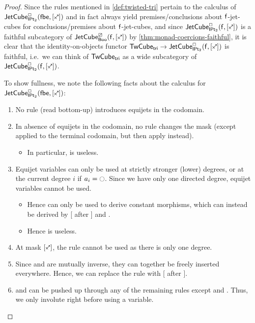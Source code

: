 \documentclass[a4paper]{memoir}
\begin{document}
\begin{proof}
	Since the rules mentioned in \cref{def:twisted-tri} pertain to the calculus of $\jetcubetri \affine \bipointedsym {[\ypolar]}$ and in fact always yield premises/conclusions about ${\mathsf{f}}$-jet-cubes for conclusions/premises about ${\mathsf{f}}$-jet-cubes, and since $\jetcubefwd \affine \bipointedsym {[\ypolar]}$ is a faithful subcategory of $\jetcubefwd \cartes \booleanalg {[\ypolar]}$ by \cref{thm:monad-coercions-faithful}, it is clear that the identity-on-objects functor $\twistedcubetri \to \jetcubefwd \affine \bipointedsym {[\ypolar]}$ is faithful, i.e.\ we can think of ${\mathsf{TwCube}}_{\mathsf{tri}}$ as a wide subcategory of $\jetcubefwd \affine \bipointedsym {[\ypolar]}$.
	
	To show fullness, we note the following facts about the calculus for $\jetcubetri \affine \bipointedsym {[\ypolar]}$:
	\begin{enumerate}
		\item No rule (read bottom-up) introduces equijets in the codomain.
		\item In absence of equijets in the codomain, no rule changes the mask (except  applied to the terminal codomain, but then apply  instead).
		\begin{itemize}
			\item In particular,  is useless.
		\end{itemize}
		\item Equijet variables can only be used at strictly stronger (lower) degrees, or at the current degree $i$ if $a_i = \npolar$. Since we have only one directed degree, equijet variables cannot be used.
		\begin{itemize}
			\item Hence  can only be used to derive constant morphisms, which can instead be derived by [ after ] and .
			\item Hence  is useless.
		\end{itemize} 
		\item At mask $[\ypolar]$, the rule  cannot be used as there is only one degree.
		\item Since  and  are mutually inverse, they can together be freely inserted everywhere. Hence, we can replace the rule  with [ after ].
		\item {} and  can be pushed up through any of the remaining rules except  and . Thus, we only involute right before using a variable.

\end{enumerate}
\end{proof}
\end{document}
